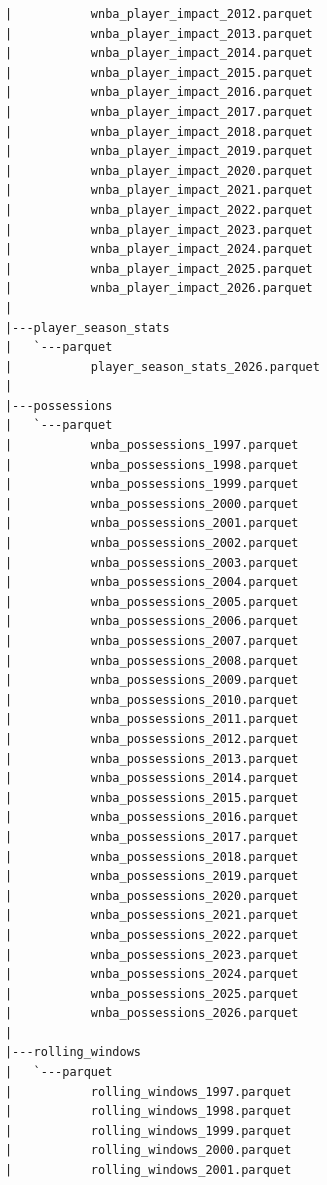 \begin{lstlisting}
      |           wnba_player_impact_2012.parquet
      |           wnba_player_impact_2013.parquet
      |           wnba_player_impact_2014.parquet
      |           wnba_player_impact_2015.parquet
      |           wnba_player_impact_2016.parquet
      |           wnba_player_impact_2017.parquet
      |           wnba_player_impact_2018.parquet
      |           wnba_player_impact_2019.parquet
      |           wnba_player_impact_2020.parquet
      |           wnba_player_impact_2021.parquet
      |           wnba_player_impact_2022.parquet
      |           wnba_player_impact_2023.parquet
      |           wnba_player_impact_2024.parquet
      |           wnba_player_impact_2025.parquet
      |           wnba_player_impact_2026.parquet
      |
      |---player_season_stats
      |   `---parquet
      |           player_season_stats_2026.parquet
      |
      |---possessions
      |   `---parquet
      |           wnba_possessions_1997.parquet
      |           wnba_possessions_1998.parquet
      |           wnba_possessions_1999.parquet
      |           wnba_possessions_2000.parquet
      |           wnba_possessions_2001.parquet
      |           wnba_possessions_2002.parquet
      |           wnba_possessions_2003.parquet
      |           wnba_possessions_2004.parquet
      |           wnba_possessions_2005.parquet
      |           wnba_possessions_2006.parquet
      |           wnba_possessions_2007.parquet
      |           wnba_possessions_2008.parquet
      |           wnba_possessions_2009.parquet
      |           wnba_possessions_2010.parquet
      |           wnba_possessions_2011.parquet
      |           wnba_possessions_2012.parquet
      |           wnba_possessions_2013.parquet
      |           wnba_possessions_2014.parquet
      |           wnba_possessions_2015.parquet
      |           wnba_possessions_2016.parquet
      |           wnba_possessions_2017.parquet
      |           wnba_possessions_2018.parquet
      |           wnba_possessions_2019.parquet
      |           wnba_possessions_2020.parquet
      |           wnba_possessions_2021.parquet
      |           wnba_possessions_2022.parquet
      |           wnba_possessions_2023.parquet
      |           wnba_possessions_2024.parquet
      |           wnba_possessions_2025.parquet
      |           wnba_possessions_2026.parquet
      |
      |---rolling_windows
      |   `---parquet
      |           rolling_windows_1997.parquet
      |           rolling_windows_1998.parquet
      |           rolling_windows_1999.parquet
      |           rolling_windows_2000.parquet
      |           rolling_windows_2001.parquet

\end{lstlisting}
